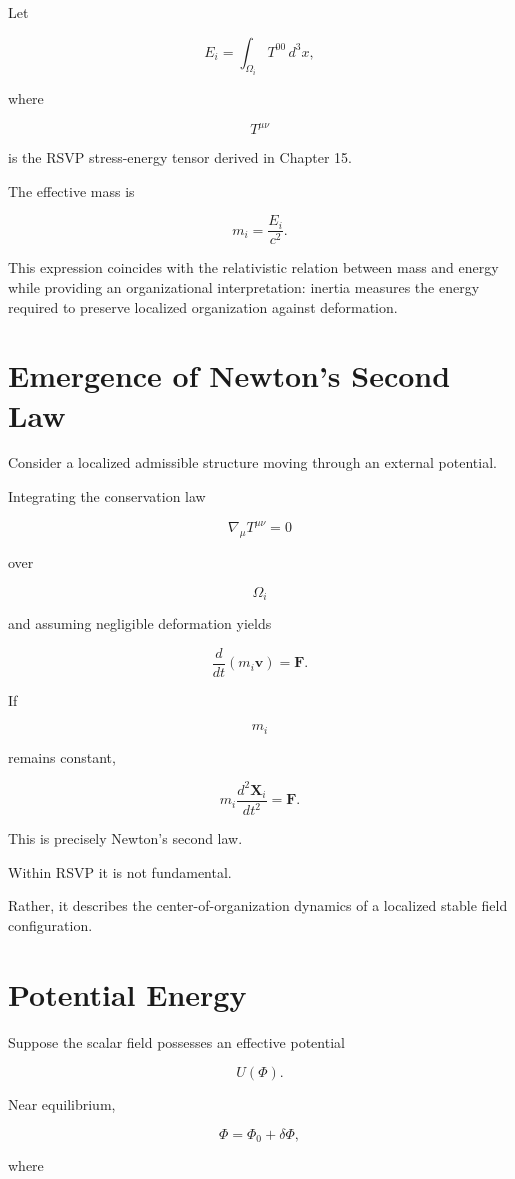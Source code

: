 \documentclass[11pt,oneside]{book}
\numberwithin{equation}{chapter}
\theoremstyle{definition}
\theoremstyle{plain}
\begin{document}
Let

\[
E_i
=
\int_{\Omega_i}
T^{00}\,d^3x,
\]

where

\[
T^{\mu\nu}
\]

is the RSVP stress-energy tensor derived in Chapter 15.

The effective mass is

\[
m_i
=
\frac{E_i}{c^2}.
\]

This expression coincides with the relativistic relation between mass and
energy while providing an organizational interpretation: inertia measures
the energy required to preserve localized organization against deformation.

\section{Emergence of Newton's Second Law}

Consider a localized admissible structure moving through an external
potential.

Integrating the conservation law

\[
\nabla_\mu
T^{\mu\nu}
=
0
\]

over

\[
\Omega_i
\]

and assuming negligible deformation yields

\[
\frac{d}{dt}
(m_i\mathbf v)
=
\mathbf F.
\]

If

\[
m_i
\]

remains constant,

\[
\boxed{
m_i
\frac{d^2\mathbf X_i}{dt^2}
=
\mathbf F.
}
\]

This is precisely Newton's second law.

Within RSVP it is not fundamental.

Rather, it describes the center-of-organization dynamics of a localized
stable field configuration.

\section{Potential Energy}

Suppose the scalar field possesses an effective potential

\[
U(\Phi).
\]

Near equilibrium,

\[
\Phi
=
\Phi_0+\delta\Phi,
\]

where
\end{document}

